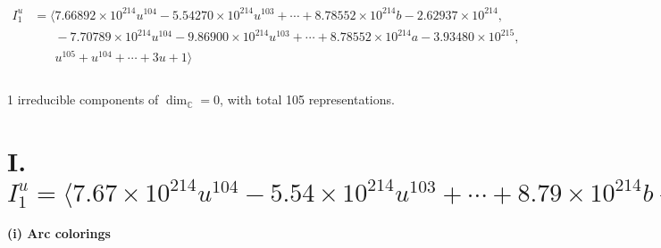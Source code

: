 \documentclass[1p]{elsarticle_modified}
\theoremstyle{definition}
\begin{document}
\begin{align*}
I^u_{1}&=\langle 
7.66892\times10^{214} u^{104}-5.54270\times10^{214} u^{103}+\cdots+8.78552\times10^{214} b-2.62937\times10^{214},\\
\phantom{I^u_{1}}&\phantom{= \langle  }-7.70789\times10^{214} u^{104}-9.86900\times10^{214} u^{103}+\cdots+8.78552\times10^{214} a-3.93480\times10^{215},\\
\phantom{I^u_{1}}&\phantom{= \langle  }u^{105}+u^{104}+\cdots+3 u+1\rangle \\
\\
\end{align*}
\raggedright * 1 irreducible components of $\dim_{\mathbb{C}}=0$, with total 105 representations.\\
\newpage
\renewcommand{\arraystretch}{1}
\centering \section*{I. $I^u_{1}= \langle 7.67\times10^{214} u^{104}-5.54\times10^{214} u^{103}+\cdots+8.79\times10^{214} b-2.63\times10^{214},\;-7.71\times10^{214} u^{104}-9.87\times10^{214} u^{103}+\cdots+8.79\times10^{214} a-3.93\times10^{215},\;u^{105}+u^{104}+\cdots+3 u+1 \rangle$}
\flushleft \textbf{(i) Arc colorings}\\
\end{document}
